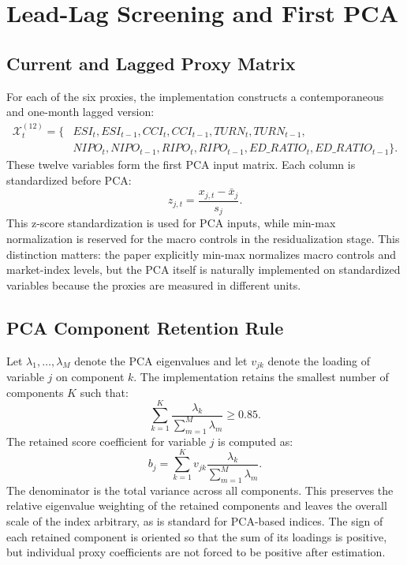 \documentclass[12pt]{article}
\begin{document}
\section{Lead-Lag Screening and First PCA}

\subsection{Current and Lagged Proxy Matrix}

For each of the six proxies, the implementation constructs a contemporaneous and one-month lagged version:
\begin{align*}
\mathcal{X}^{(12)}_t = \{&
ESI_t, ESI_{t-1}, CCI_t, CCI_{t-1}, TURN_t, TURN_{t-1},\\
&NIPO_t, NIPO_{t-1}, RIPO_t, RIPO_{t-1}, ED\_RATIO_t, ED\_RATIO_{t-1}\}.
\end{align*}
These twelve variables form the first PCA input matrix. Each column is standardized before PCA:
\[
z_{j,t} = \frac{x_{j,t}-\bar{x}_j}{s_j}.
\]
This z-score standardization is used for PCA inputs, while min-max normalization is reserved for the macro controls in the residualization stage. This distinction matters: the paper explicitly min-max normalizes macro controls and market-index levels, but the PCA itself is naturally implemented on standardized variables because the proxies are measured in different units.

\subsection{PCA Component Retention Rule}

Let \(\lambda_1,\ldots,\lambda_M\) denote the PCA eigenvalues and let \(v_{jk}\) denote the loading of variable \(j\) on component \(k\). The implementation retains the smallest number of components \(K\) such that:
\[
\sum_{k=1}^{K}\frac{\lambda_k}{\sum_{m=1}^{M}\lambda_m} \geq 0.85.
\]
The retained score coefficient for variable \(j\) is computed as:
\[
b_j = \sum_{k=1}^{K} v_{jk}\frac{\lambda_k}{\sum_{m=1}^{M}\lambda_m}.
\]
The denominator is the total variance across all components. This preserves the relative eigenvalue weighting of the retained components and leaves the overall scale of the index arbitrary, as is standard for PCA-based indices. The sign of each retained component is oriented so that the sum of its loadings is positive, but individual proxy coefficients are not forced to be positive after estimation.
\end{document}
